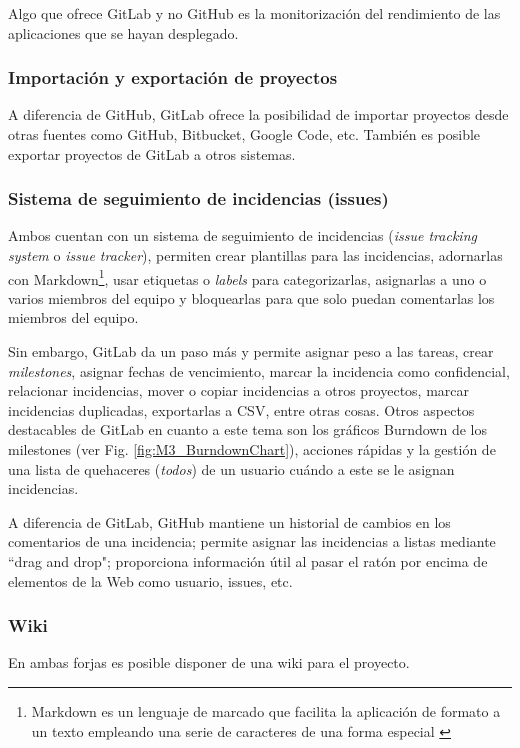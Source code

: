 Algo que ofrece GitLab y no GitHub es la monitorización del rendimiento de las aplicaciones que se hayan desplegado.

\subsubsection{Importación y exportación de proyectos}
A diferencia de GitHub, GitLab ofrece la posibilidad de importar proyectos desde otras fuentes como GitHub, Bitbucket, Google Code, etc. También es posible exportar proyectos de GitLab a otros sistemas.

\subsubsection{Sistema de seguimiento de incidencias (issues)}
Ambos cuentan con un sistema de seguimiento de incidencias (\textit{issue tracking system} o \textit{issue tracker}), permiten crear plantillas para las incidencias, adornarlas con Markdown\footnote{Markdown es un lenguaje de marcado que facilita la aplicación de formato a un texto empleando una serie de caracteres de una forma especial \citep{lasso_que_2013}}, usar etiquetas o \textit{labels} para categorizarlas, asignarlas a uno o varios miembros del equipo y bloquearlas para que solo puedan comentarlas los miembros del equipo.

Sin embargo, GitLab da un paso más y permite asignar peso a las tareas, crear \textit{milestones}, asignar fechas de vencimiento, marcar la incidencia como confidencial, relacionar incidencias, mover o copiar incidencias a otros proyectos, marcar incidencias duplicadas, exportarlas a CSV, entre otras cosas. Otros aspectos destacables de GitLab en cuanto a este tema son los gráficos Burndown de los milestones (ver Fig. \ref{fig:M3_BurndownChart}), acciones rápidas y la gestión de una lista de quehaceres (\textit{todos}) de un usuario cuándo a este se le asignan incidencias.


A diferencia de GitLab, GitHub mantiene un historial de cambios en los comentarios de una incidencia; permite asignar las incidencias a listas mediante ``drag and drop"; proporciona información útil al pasar el ratón por encima de elementos de la Web como usuario, issues, etc.

\subsubsection{Wiki}
En ambas forjas es posible disponer de una wiki para el proyecto.

